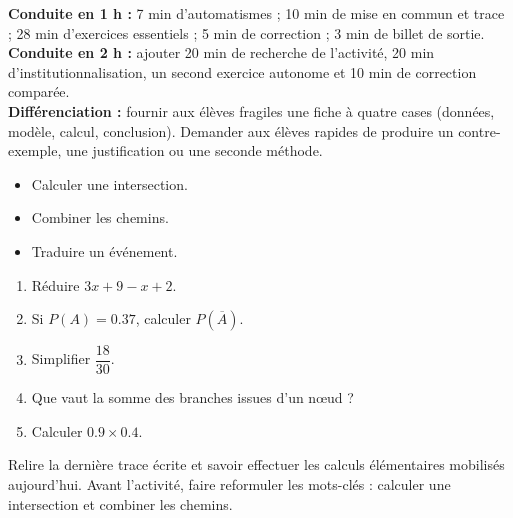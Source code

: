     \ifmxteacher
    \begin{method}
    \textbf{Conduite en 1 h :} 7 min d'automatismes ; 10 min de mise en commun et trace ; 28 min d'exercices essentiels ; 5 min de correction ; 3 min de billet de sortie.\\
    \textbf{Conduite en 2 h :} ajouter 20 min de recherche de l'activité, 20 min d'institutionnalisation, un second exercice autonome et 10 min de correction comparée.\\
    \textbf{Différenciation :} fournir aux élèves fragiles une fiche à quatre cases (données, modèle, calcul, conclusion). Demander aux élèves rapides de produire un contre-exemple, une justification ou une seconde méthode.
    \end{method}
    \fi
{}
    \begin{objectives}\begin{itemize}\item Calculer une intersection.\item Combiner les chemins.\item Traduire un événement.\end{itemize}\end{objectives}
    \begin{fluency}\begin{enumerate}\item Réduire $3x+9-x+2$. \item Si $P(A)=\num{0,37}$, calculer $P(\overline A)$. \item Simplifier $\dfrac{18}{30}$. \item Que vaut la somme des branches issues d'un nœud ? \item Calculer $\num{0,9}\times\num{0,4}$. \end{enumerate}\end{fluency}
    \begin{prerequisites}Relire la dernière trace écrite et savoir effectuer les calculs élémentaires mobilisés aujourd'hui. Avant l'activité, faire reformuler les mots-clés : calculer une intersection et combiner les chemins.\end{prerequisites}

